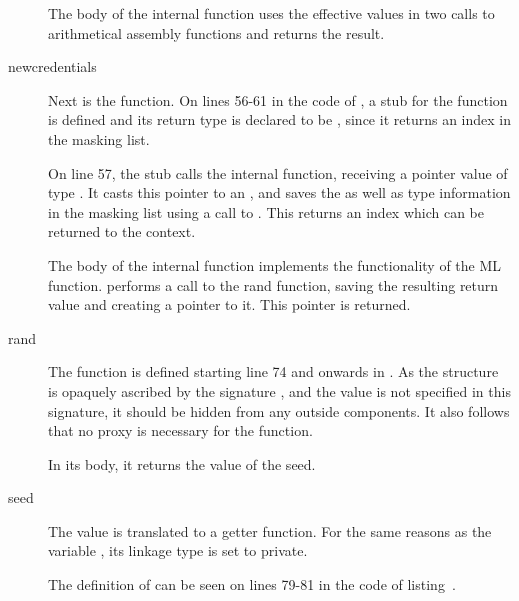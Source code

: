 \begin{description}
The body of the internal function uses the effective values in two calls to arithmetical assembly functions and returns the result.

\item[newcredentials] Next is the  function.
On lines 56-61 in the code of , a stub for the function is defined and its return type is declared to be , since it returns an index in the masking list.

On line 57, the stub calls the internal function, receiving a pointer value of type .
It casts this pointer to an , and saves the  as well as type information in the masking list using a call to .
This returns an index which can be returned to the context.


The body of the internal function  implements the functionality of the ML  function.
 performs a call to the rand function, saving the resulting return value and creating a pointer to it.
This pointer is returned.

\item[rand] The function  is defined starting line 74 and onwards in .
As the structure  is opaquely ascribed by the signature , and the value  is not specified in this signature, it should be hidden from any outside components. 
It also follows that no proxy is necessary for the  function.

In its body, it returns the value of the seed.

\item[seed] The value  is translated to a getter function.
For the same reasons as the variable , its linkage type is set to private. 

The definition of  can be seen on lines 79-81 in the code of listing~.
\end{description}

